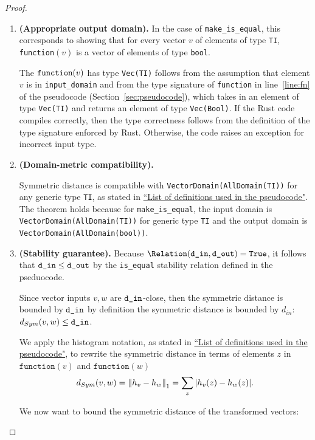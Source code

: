\begin{proof}
\begin{enumerate}
\item \textbf{(Appropriate output domain).} In the case of \texttt{make\_is\_equal}, this corresponds to showing that for every vector $v$ of elements of type \texttt{TI}, \texttt{function}$(v)$ is a vector of elements of type \texttt{bool}.


The $\texttt{function}(v)$ has type \texttt{Vec(TI)} follows from the assumption that element $v$ is in \texttt{input\_domain} and from the type signature of \texttt{function} in line~\ref{line:fn} of the pseudocode (Section~\ref{sec:pseudocode}), which takes in an element of type \texttt{Vec(TI)} and returns an element of type \texttt{Vec(Bool)}. If the Rust code compiles correctly, then the type correctness follows from the definition of the type signature enforced by Rust. Otherwise, the code raises an exception for incorrect input type. 

\item \textbf{(Domain-metric compatibility).} 

Symmetric distance is compatible with \texttt{VectorDomain(AllDomain(TI))} for any generic type \texttt{TI}, as stated in \href{https://www.overleaf.com/project/60d215bf90b337ac02200a99}{``List of definitions used in the pseudocode"}. The theorem holds because for \texttt{make\_is\_equal}, the input domain is \texttt{VectorDomain(AllDomain(TI))} for generic type \texttt{TI} and the output domain is \texttt{VectorDomain(AllDomain(bool))}. 

\item \textbf{(Stability guarantee).} 
Because $\Relation(\din, \dout) = \texttt{True}$, it follows that $\texttt{d\_in} \leq \texttt{d\_out}$ by the \texttt{is\_equal} stability relation defined in the pseduocode.

Since vector inputs $v, w$ are $\texttt{d\_in}$-close, then the symmetric distance is bounded by $\texttt{d\_in}$ by definition the symmetric distance is bounded by $d_{in}$: $d_{Sym}(v, w) \leq \texttt{d\_in}$.

We apply the histogram notation, as stated in \href{https://www.overleaf.com/project/60d215bf90b337ac02200a99}{``List of definitions used in the pseudocode"}, to rewrite the symmetric distance in terms of elements $z$ in $\texttt{function}(v)$ and $\texttt{function}(w)$
$$d_{Sym}(v, w) = \norm{h_v - h_w}_1 = \sum_{z} \abs{h_v(z) - h_w(z)}.$$ 

We now want to bound the symmetric distance of the transformed vectors:


\end{enumerate}
\end{proof}
